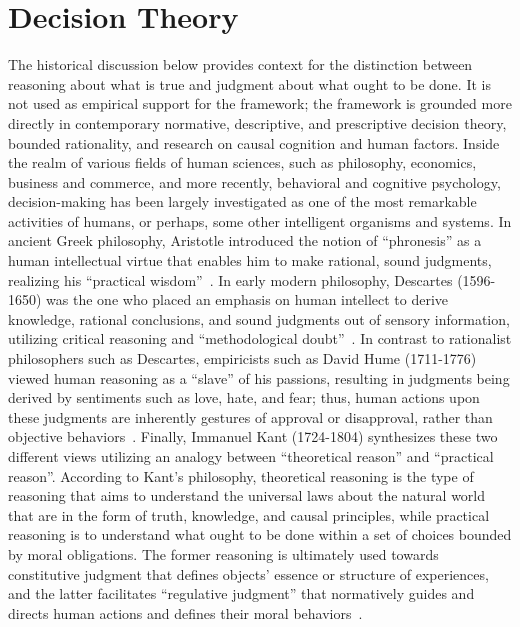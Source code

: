 \documentclass{sfuthesis}
\begin{document}
\section{Decision Theory}
The historical discussion below provides context for the distinction between reasoning about what is true and judgment about what ought to be done. It is not used as empirical support for the framework; the framework is grounded more directly in contemporary normative, descriptive, and prescriptive decision theory, bounded rationality, and research on causal cognition and human factors.
Inside the realm of various fields of human sciences, such as philosophy, economics, business and commerce, and more recently, behavioral and cognitive psychology, decision-making has been largely investigated as one of the most remarkable activities of humans, or perhaps, some other intelligent organisms and systems. In ancient Greek philosophy, Aristotle introduced the notion of “phronesis” as a human intellectual virtue that enables him to make rational, sound judgments, realizing his “practical wisdom”~\cite{bartlett_aristotles_2011}. In early modern philosophy, Descartes (1596-1650) was the one who placed an emphasis on human intellect to derive knowledge, rational conclusions, and sound judgments out of sensory information, utilizing critical reasoning and “methodological doubt”~\cite{descartes_meditations_2008}. In contrast to rationalist philosophers such as Descartes, empiricists such as David Hume (1711-1776) viewed human reasoning as a “slave” of his passions, resulting in judgments being derived by sentiments such as love, hate, and fear; thus, human actions upon these judgments are inherently gestures of approval or disapproval, rather than objective behaviors~\cite{hume_treatise_2000}. Finally, Immanuel Kant (1724-1804) synthesizes these two different views utilizing an analogy between “theoretical reason” and “practical reason”. According to Kant’s philosophy, theoretical reasoning is the type of reasoning that aims to understand the universal laws about the natural world that are in the form of truth, knowledge, and causal principles, while practical reasoning is to understand what ought to be done within a set of choices bounded by moral obligations. The former reasoning is ultimately used towards constitutive judgment that defines objects’ essence or structure of experiences, and the latter facilitates “regulative judgment” that normatively guides and directs human actions and defines their moral behaviors~\cite{de_pierris_kant_2008}.\par
\end{document}
